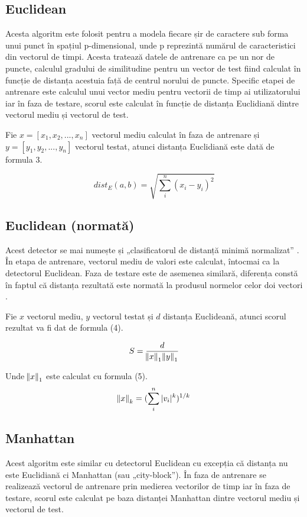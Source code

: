 \documentclass[9pt,shortpaper,twoside,web]{ieeecolor}
\begin{document}
\subsection{Euclidean}
	Acesta algoritm este folosit pentru a modela fiecare șir de caractere sub forma unui punct în spațiul p-dimensional, unde p reprezintă numărul de caracteristici din vectorul de timpi. Acesta tratează datele de antrenare ca pe un nor de puncte, calculul gradului de similitudine pentru un vector de test fiind calculat în funcție de distanța acestuia față de centrul norului de puncte. Specific etapei de antrenare este calculul unui vector mediu pentru vectorii de timp ai utilizatorului iar în faza de testare, scorul este calculat în funcție de distanța Euclidiană dintre vectorul mediu și vectorul de test.
	
	Fie $x = [x_1,x_2, ..., x_n]$ vectorul mediu calculat în faza de antrenare și $y = [y_1,y_2, ..., y_n]$ vectorul testat, atunci distanța Euclidiană este dată de formula 3.
	
\begin{equation}  \label{eq3}
	dist_E(a, b) = \sqrt{\sum\limits_{i}^n(x_i - y_i)^2}
\end{equation}

\subsection{Euclidean (normată)}
	Acest detector se mai numește și „clasificatorul de distanță minimă normalizat” \cite{b13}. În etapa de antrenare, vectorul mediu de valori este calculat, întocmai ca la detectorul Euclidean. Faza de testare este de asemenea similară, diferența constă în faptul că distanța rezultată este normată la produsul normelor celor doi vectori \cite{b13}.
	
	Fie $x$ vectorul mediu, $y$ vectorul testat și $d$ distanța Euclideană, atunci scorul rezultat va fi dat de formula (4).

\begin{equation}  \label{eq4}
	S = \frac{d}{\norm{x}_1 \norm{y}_1}
\end{equation}

	Unde $\norm{x}_1$ este calculat cu formula (5).
\begin{equation}  \label{eq5}
	\norm{x}_k = (\sum\limits_{i}^n |v_i|^k)^{1/k}
\end{equation}

\subsection{Manhattan}
	Acest algoritm este similar cu detectorul Euclidean cu excepția că distanța nu este Euclidiană ci Manhattan (sau „city-block”). În faza de antrenare se realizează vectorul de antrenare prin medierea vectorilor de timp iar în faza de testare, scorul este calculat pe baza distanței Manhattan dintre vectorul mediu și vectorul de test.
	
\end{document}
